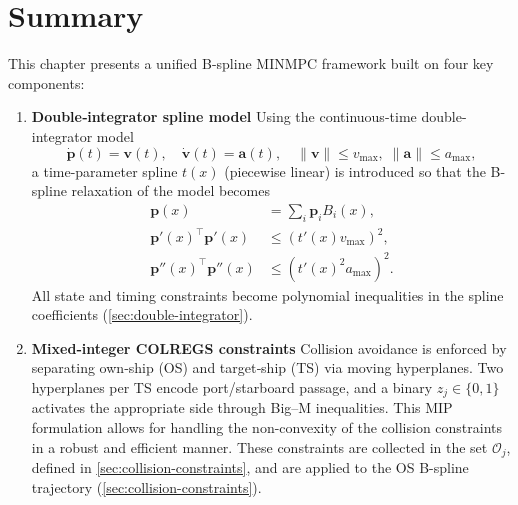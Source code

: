 \section{Summary}
This chapter presents a unified B-spline MINMPC framework built on four key components:

\begin{enumerate}
  \item \textbf{Double‐integrator spline model}  
    Using the continuous-time double-integrator model
    \begin{equation}
      \dot{\mathbf p}(t)=\mathbf v(t),\quad
      \dot{\mathbf v}(t)=\mathbf a(t),\quad
      \|\mathbf v\|\le v_{\max},\;\|\mathbf a\|\le a_{\max},
    \end{equation}
    a time-parameter spline $t(x)$ (piecewise linear) is introduced so that the B-spline relaxation of the model becomes 
    \begin{equation}
        \begin{aligned}
            \mathbf p(x)&=\sum_i\mathbf p_iB_i(x), \\
            \mathbf p'(x)^\top\mathbf p'(x)&\le (t'(x)v_{\max})^2, \\
            \mathbf p''(x)^\top\mathbf p''(x)&\le (t'(x)^2a_{\max})^2.
        \end{aligned}
    \end{equation}
    All state and timing constraints become polynomial inequalities in the spline coefficients (\cref{sec:double-integrator}).

  \item \textbf{Mixed‐integer COLREGS constraints}  
    Collision avoidance is enforced by separating own‐ship (OS) and target‐ship (TS) via moving hyperplanes. Two hyperplanes per TS encode port/starboard passage, and a binary $z_j\in\{0,1\}$ activates the appropriate side through Big–M inequalities. This MIP formulation allows for handling the non-convexity of the collision constraints in a robust and efficient manner. These constraints are collected in the set $\mathcal{O}_j$, defined in \cref{sec:collision-constraints}, and are applied to the OS B-spline trajectory (\cref{sec:collision-constraints}).


\end{enumerate}
